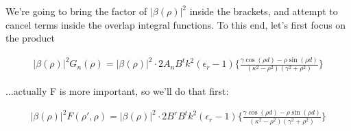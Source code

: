 \documentclass[11pt, oneside]{article}   	%
\begin{document}
We're going to bring the factor of $|\beta(\rho)|^{2}$ inside the brackets, and attempt to cancel terms inside the overlap integral functions. To this end, let's first focus on the product

\begin{align*}
|\beta(\rho)|^{2} G_n(\rho) = |\beta(\rho)|^{2} \cdot 2 A_{n} B^{t} k^{2} (\epsilon_{r} - 1) \bigg\{ \frac{\gamma \cos(\rho d) - \rho \sin(\rho d)}{(\kappa^{2} - \rho^{2})(\gamma^{2} + \rho^{2})} \bigg\}
\end{align*}

...actually F is more important, so we'll do that first:

\begin{align*}
|\beta(\rho)|^{2} F(\rho',\rho) = |\beta(\rho)|^{2} \cdot 2 B^{r} B^{t} k^{2} (\epsilon_{r} - 1) \bigg\{ \frac{\gamma \cos(\rho d) - \rho \sin(\rho d)}{(\kappa^{2} - \rho^{2})(\gamma^{2} + \rho^{2})} \bigg\}
\end{align*}
\end{document}
